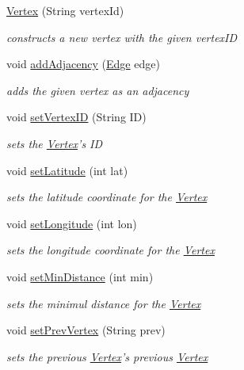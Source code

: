 \begin{DoxyCompactItemize}
\item 
\hyperlink{class_vertex_a9cad0b2dfe2d2d0979d47b2be8325598}{Vertex} (String vertex\+Id)
\begin{DoxyCompactList}\small\item\em constructs a new vertex with the given vertex\+I\+D \end{DoxyCompactList}\item 
void \hyperlink{class_vertex_a36d64c57d236fb0b9c059e2584b53496}{add\+Adjacency} (\hyperlink{class_edge}{Edge} edge)
\begin{DoxyCompactList}\small\item\em adds the given vertex as an adjacency \end{DoxyCompactList}\item 
void \hyperlink{class_vertex_ae9ab92525b737f12bf6ed806d7d3a749}{set\+Vertex\+I\+D} (String I\+D)
\begin{DoxyCompactList}\small\item\em sets the \hyperlink{class_vertex}{Vertex}'s I\+D \end{DoxyCompactList}\item 
void \hyperlink{class_vertex_a98183e2dab0e6b001de3e07d5dd881a3}{set\+Latitude} (int lat)
\begin{DoxyCompactList}\small\item\em sets the latitude coordinate for the \hyperlink{class_vertex}{Vertex} \end{DoxyCompactList}\item 
void \hyperlink{class_vertex_a29dca66870088075feb30929f2908cf4}{set\+Longitude} (int lon)
\begin{DoxyCompactList}\small\item\em sets the longitude coordinate for the \hyperlink{class_vertex}{Vertex} \end{DoxyCompactList}\item 
void \hyperlink{class_vertex_a5d438de1e0b630a74195c816216f092e}{set\+Min\+Distance} (int min)
\begin{DoxyCompactList}\small\item\em sets the minimul distance for the \hyperlink{class_vertex}{Vertex} \end{DoxyCompactList}\item 
void \hyperlink{class_vertex_aae1304e9e84e3cc4dc5c58e12909ee2b}{set\+Prev\+Vertex} (String prev)
\begin{DoxyCompactList}\small\item\em sets the previous \hyperlink{class_vertex}{Vertex}'s previous \hyperlink{class_vertex}{Vertex} \end{DoxyCompactList}\item 

\end{DoxyCompactItemize}
